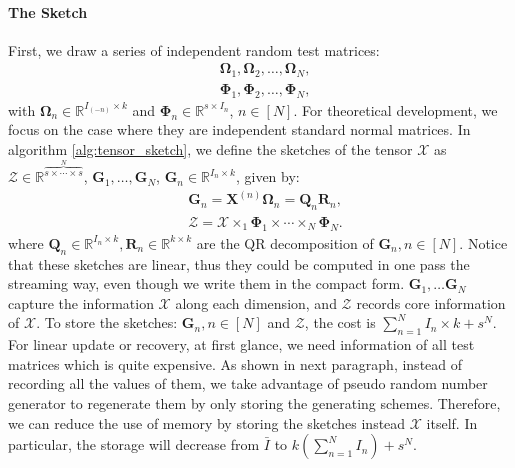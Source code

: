 \paragraph{The Sketch}  First, we draw a series of independent random test matrices: 
\begin{equation}
\begin{aligned}
&\mathbf{\Omega}_1, \mathbf{\Omega}_2, \dots, \mathbf{\Omega}_N, \\
&\mathbf{\Phi}_1, \mathbf{\Phi}_2, \dots, \mathbf{\Phi}_N,
\end{aligned}
\end{equation}
with $\mathbf{\Omega}_n \in \mathbb{R}^{I_{(-n)} \times k}$ and $\mathbf{\Phi}_n \in \mathbb{R}^{s\times I_n}$, $n \in [N]$. For theoretical development, we focus on the case where they are independent standard normal matrices. 
In algorithm \ref{alg:tensor_sketch}, we define the sketches of the tensor $\mathscr{X}$ as $\mathscr{Z} \in \mathbb{R}^{ \overbrace{s \times \cdots \times s}^{N}} $, $\mathbf{G}_1, \dots, \mathbf{G}_N$, $\mathbf{G}_n \in \mathbb{R}^{I_n \times k}$, given by: 
\begin{equation}
\label{eq:sketchy_matrix}
\begin{aligned}
&\mathbf{G}_n = \mathbf{X}^{(n)}\mathbf{\Omega}_n   = \mathbf{Q}_n\mathbf{R}_n, \\
&\mathscr{Z} = \mathscr{X} \times_1 \mathbf{\Phi}_1 \times \cdots \times_N \mathbf{\Phi}_N.
\end{aligned}
\end{equation}
where $\mathbf{Q}_n \in \mathbb{R}^{I_n \times k}, \mathbf{R}_n \in \mathbb{R}^{k\times k}$ are the QR decomposition of $\mathbf{G}_n , n\in [N]$. Notice that these sketches are linear, thus they could be computed in one pass the streaming way, even though we write them in the compact form. $\mathbf{G}_1, \dots \mathbf{G}_N$ capture the information $\mathscr{X}$ along each dimension, and $\mathscr{Z}$ records core information of $\mathscr{X}$. To store the sketches: $\mathbf{G}_n, n \in [N]$ and $\mathscr{Z}$, the cost is
$\sum_{n=1}^N I_n\times k + s^N $. For linear update or recovery, at first glance, we need information of all test matrices which is quite expensive. As shown in next paragraph, instead of recording all the values of them, we take advantage of pseudo random number generator to regenerate them by only storing the generating schemes.  Therefore, we can reduce the use of memory by storing the sketches instead $\mathscr{X}$ itself. In particular, the storage will decrease from $\bar{I}$ to $k(\sum_{n = 1}^N I_n)+s^N$. 


